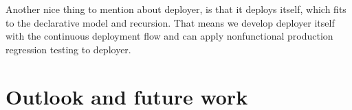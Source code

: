 Another nice thing to mention about deployer, is that it deploys itself, which fits to the
declarative model and recursion. That means we develop deployer itself with the continuous
deployment flow and can apply nonfunctional production regression testing to deployer.



\section{Outlook and future work}






